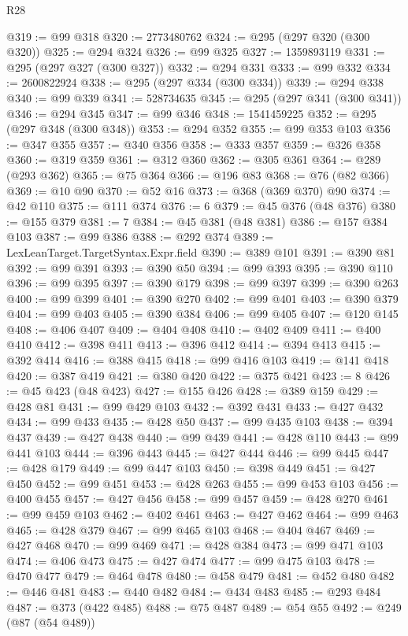 \begin{lexlean}{R28}
\begin{coremodule}
@319 := @99 @318
@320 := 2773480762
@324 := @295 (@297 @320 (@300 @320))
@325 := @294 @324
@326 := @99 @325
@327 := 1359893119
@331 := @295 (@297 @327 (@300 @327))
@332 := @294 @331
@333 := @99 @332
@334 := 2600822924
@338 := @295 (@297 @334 (@300 @334))
@339 := @294 @338
@340 := @99 @339
@341 := 528734635
@345 := @295 (@297 @341 (@300 @341))
@346 := @294 @345
@347 := @99 @346
@348 := 1541459225
@352 := @295 (@297 @348 (@300 @348))
@353 := @294 @352
@355 := @99 @353 @103
@356 := @347 @355
@357 := @340 @356
@358 := @333 @357
@359 := @326 @358
@360 := @319 @359
@361 := @312 @360
@362 := @305 @361
@364 := @289 (@293 @362)
@365 := @75 @364
@366 := @196 @83
@368 := @76 (@82 @366)
@369 := @10 @90
@370 := @52 @16
@373 := @368 (@369 @370) @90
@374 := @42 @110
@375 := @111 @374
@376 := 6
@379 := @45 @376 (@48 @376)
@380 := @155 @379
@381 := 7
@384 := @45 @381 (@48 @381)
@386 := @157 @384 @103
@387 := @99 @386
@388 := @292 @374
@389 := LexLeanTarget.TargetSyntax.Expr.field
@390 := @389 @101
@391 := @390 @81
@392 := @99 @391
@393 := @390 @50
@394 := @99 @393
@395 := @390 @110
@396 := @99 @395
@397 := @390 @179
@398 := @99 @397
@399 := @390 @263
@400 := @99 @399
@401 := @390 @270
@402 := @99 @401
@403 := @390 @379
@404 := @99 @403
@405 := @390 @384
@406 := @99 @405
@407 := @120 @145
@408 := @406 @407
@409 := @404 @408
@410 := @402 @409
@411 := @400 @410
@412 := @398 @411
@413 := @396 @412
@414 := @394 @413
@415 := @392 @414
@416 := @388 @415
@418 := @99 @416 @103
@419 := @141 @418
@420 := @387 @419
@421 := @380 @420
@422 := @375 @421
@423 := 8
@426 := @45 @423 (@48 @423)
@427 := @155 @426
@428 := @389 @159
@429 := @428 @81
@431 := @99 @429 @103
@432 := @392 @431
@433 := @427 @432
@434 := @99 @433
@435 := @428 @50
@437 := @99 @435 @103
@438 := @394 @437
@439 := @427 @438
@440 := @99 @439
@441 := @428 @110
@443 := @99 @441 @103
@444 := @396 @443
@445 := @427 @444
@446 := @99 @445
@447 := @428 @179
@449 := @99 @447 @103
@450 := @398 @449
@451 := @427 @450
@452 := @99 @451
@453 := @428 @263
@455 := @99 @453 @103
@456 := @400 @455
@457 := @427 @456
@458 := @99 @457
@459 := @428 @270
@461 := @99 @459 @103
@462 := @402 @461
@463 := @427 @462
@464 := @99 @463
@465 := @428 @379
@467 := @99 @465 @103
@468 := @404 @467
@469 := @427 @468
@470 := @99 @469
@471 := @428 @384
@473 := @99 @471 @103
@474 := @406 @473
@475 := @427 @474
@477 := @99 @475 @103
@478 := @470 @477
@479 := @464 @478
@480 := @458 @479
@481 := @452 @480
@482 := @446 @481
@483 := @440 @482
@484 := @434 @483
@485 := @293 @484
@487 := @373 (@422 @485)
@488 := @75 @487
@489 := @54 @55
@492 := @249 (@87 (@54 @489))

\end{coremodule}
\end{lexlean}
